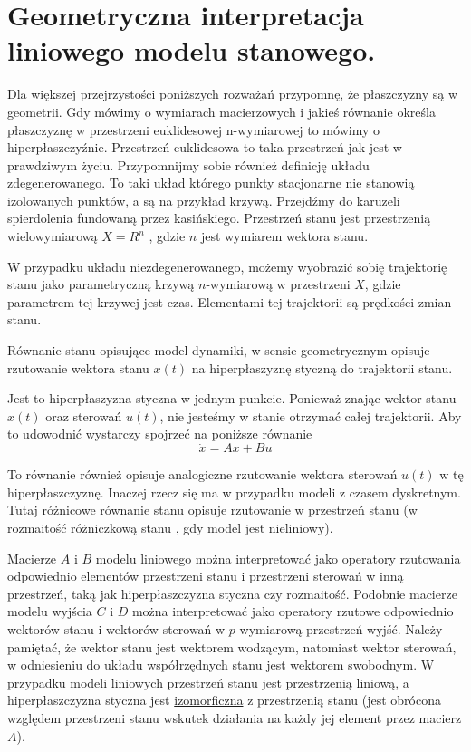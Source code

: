 \documentclass{article}
\begin{document}
	\section{Geometryczna interpretacja liniowego modelu stanowego.}
		Dla większej przejrzystości poniższych rozważań przypomnę, że płaszczyzny
		są w geometrii. Gdy mówimy o wymiarach macierzowych i jakieś równanie określa
		płaszczyznę w przestrzeni euklidesowej n-wymiarowej to mówimy o 
		hiperpłaszczyźnie.
		Przestrzeń euklidesowa to taka przestrzeń jak jest w prawdziwym życiu.
		Przypomnijmy sobie również definicję układu zdegenerowanego. 
		To taki układ którego punkty stacjonarne nie 
		stanowią izolowanych punktów, a są na przykład krzywą.
		\newline
		Przejdźmy do karuzeli spierdolenia fundowaną przez kasińskiego.
		\newline
		Przestrzeń stanu jest przestrzenią wielowymiarową
		$X = R^n$ , gdzie $n$ jest wymiarem wektora stanu.

		W przypadku układu niezdegenerowanego, możemy wyobrazić sobię trajektorię stanu
		jako parametryczną krzywą $n$-wymiarową w przestrzeni $X$, gdzie parametrem
		tej krzywej jest czas.
		Elementami tej trajektorii są prędkości zmian stanu.

		Równanie stanu opisujące model dynamiki, w sensie geometrycznym opisuje
		rzutowanie wektora stanu $x(t)$ na hiperpłaszyznę styczną do trajektorii stanu.

		Jest to hiperpłaszyzna styczna w jednym punkcie. Ponieważ znając wektor stanu $x(t)$ oraz 
		sterowań $u(t)$, nie jesteśmy w stanie otrzymać całej trajektorii.
		Aby to udowodnić wystarczy spojrzeć na poniższe równanie
		\begin{equation}
			\dot{x} = Ax + Bu
		\end{equation}

		To równanie również opisuje analogiczne rzutowanie wektora sterowań $u(t)$ w tę
		hiperpłaszczyznę. Inaczej rzecz się ma w przypadku
		modeli z czasem dyskretnym. Tutaj różnicowe równanie stanu opisuje rzutowanie w
		przestrzeń stanu (w rozmaitość różniczkową stanu , gdy model jest nieliniowy).


		Macierze $A$ i $B$ modelu liniowego można interpretować jako operatory rzutowania
		odpowiednio elementów przestrzeni stanu i przestrzeni
		sterowań w inną przestrzeń, taką jak hiperpłaszczyzna styczna czy rozmaitość.
		Podobnie macierze modelu wyjścia $C$ i $D$ można
		interpretować jako operatory rzutowe odpowiednio wektorów stanu i wektorów
		sterowań w $p$ wymiarową przestrzeń wyjść. Należy pamiętać, że wektor stanu jest
		wektorem wodzącym, natomiast wektor sterowań, w odniesieniu do układu
		współrzędnych stanu jest wektorem swobodnym. W przypadku modeli liniowych
		przestrzeń stanu jest przestrzenią liniową, a hiperpłaszczyzna styczna jest 
		\href{https://en.wikipedia.org/wiki/Isomorphism}{izomorficzna}
		z przestrzenią stanu (jest obrócona względem przestrzeni stanu wskutek działania na
		każdy jej element przez macierz $A$).
\end{document}
